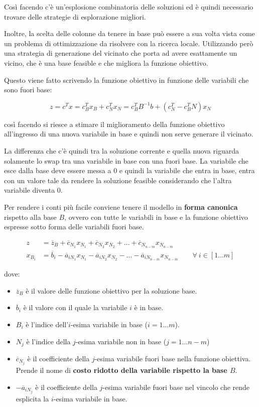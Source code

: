 \noindent Così facendo c'è un'esplosione combinatoria delle soluzioni ed è quindi necessario trovare delle strategie di esplorazione migliori.

Inoltre, la scelta delle colonne da tenere in base può essere a sua volta vista come un problema di ottimizzazione da risolvere con la ricerca locale.
Utilizzando però una strategia di generazione del vicinato che porta ad avere esattamente un vicino, che è una base feasible e che migliora la funzione obiettivo.

Questo viene fatto scrivendo la funzione obiettivo in funzione delle variabili che sono fuori base:

$$
z = c^T x = c_{B}^T x_B + c_{N}^T x_N = c_{B}^T B^{-1}b + (c_{N}^T - c_{B}^T N) x_N
$$

\noindent così facendo si riesce a stimare il miglioramento della funzione obiettivo all'ingresso di una nuova variabile in base e quindi non serve generare il vicinato.

La differenza che c'è quindi tra la soluzione corrente e quella nuova riguarda solamente lo swap tra una variabile in base con una fuori base.
La variabile che esce dalla base deve essere messa a 0 e quindi la variabile che entra in base, entra con un valore tale da rendere la soluzione feasible considerando che l'altra variabile diventa 0.

Per rendere i conti più facile conviene tenere il modello in \textbf{forma canonica} rispetto alla base $B$, ovvero con tutte le variabili in base e la funzione obiettivo espresse sotto forma delle variabili fuori base.

\begin{align*}
	z &= \overline{z}_B + \overline{c}_{N_1} x_{N_1} 
	+ \overline{c}_{N_2} x_{N_2} + \ldots + \overline{c}_{N_{n-m}} x_{N_{n-m}} \\
	x_{B_i} &= \overline{b}_i - \overline{a}_{iN_1} x_{N_1} -\overline{a}_{iN_2} x_{N_2} - \ldots - \overline{a}_{iN_{n-m}} x_{N_{n-m}} \qquad \forall \: i \in [1 \ldots m]
\end{align*}

\noindent dove:

\begin{itemize}
	\item $\overline{z}_B$ è il valore delle funzione obiettivo per la soluzione base.
	\item $\overline{b}_i$ è il valore con il quale la variabile $i$ è in base.
	\item $B_i$ è l'indice dell'$i$-esima variabile in base ($i = 1\ldots m$).
	\item $N_j$ è l'indice della $j$-esima variabile non in base ($j = 1 \ldots n-m$)
	\item $\overline{c}_{N_j}$ è il coefficiente della $j$-esima variabile fuori base nella funzione obiettiva. Prende il nome di \textbf{costo ridotto della variabile rispetto la base $B$}.
	\item $-\overline{a}_{iN_j}$ è il coefficiente della $j$-esima variabile fuori base nel vincolo che rende esplicita la $i$-esima variabile in base.
\end{itemize}

